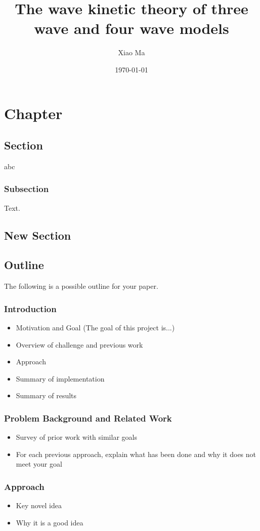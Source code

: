 \documentclass{puthesis-UG}
\title{The wave kinetic theory of three wave and four wave models}
\author{Xiao Ma}
\date{\today}
\begin{document}
\chapter{Chapter}

\section{Section}
abc\\




\subsection{Subsection}

Text.

\section{New Section}
\section{Outline}  
The following is a possible outline for your paper.
\subsection{Introduction}
\begin{itemize}
\item Motivation and Goal (The goal of this project is...)
\item Overview of challenge and previous work 
\item Approach 
\item Summary of implementation
\item Summary of results
\end{itemize}




\subsection{Problem Background and Related Work}
\begin{itemize}
\item Survey of prior work with similar goals 
\item For each previous approach, explain what has been done and why it does not meet your goal
\end{itemize}

\subsection{Approach}
\begin{itemize}
\item Key novel idea
\item Why it is a good idea
\end{itemize}
\end{document}
